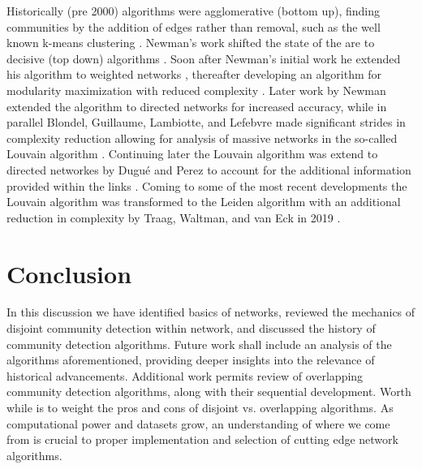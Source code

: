 \documentclass[a4paper, 12pt, twocolumn]{article}
\begin{document}
Historically (pre 2000) algorithms were agglomerative (bottom up), finding communities by the addition of edges rather than removal, such as the well known k-means clustering \cite{least_squares_PCM, some_methods}.
Newman's work shifted the state of the are to decisive (top down) algorithms \cite{com_struct_in_soc_and_bio}.
Soon after Newman's initial work he extended his algorithm to weighted networks \cite{analysis_of_wnets}, thereafter developing an algorithm for modularity maximization with reduced complexity \cite{finding_comm_struct}.
Later work by Newman extended the algorithm to directed networks \cite{com_struct_indir} for increased accuracy, while in parallel Blondel, Guillaume, Lambiotte, and Lefebvre made significant strides in complexity reduction allowing for analysis of massive networks in the so-called Louvain algorithm \cite{louvain}.
Continuing later the Louvain algorithm was extend to directed networkes by Dugu{\'e} and Perez to account for the additional information provided within the links \cite{directed_louvain}.
Coming to some of the most recent developments the Louvain algorithm was transformed to the Leiden algorithm with an additional reduction in complexity by Traag, Waltman, and van Eck in 2019 \cite{louvain_2_leiden}.


\section{Conclusion}

In this discussion we have identified basics of networks, reviewed the mechanics of disjoint community detection within network, and discussed the history of community detection algorithms.
Future work shall include an analysis of the algorithms aforementioned, providing deeper insights into the relevance of historical advancements.
Additional work permits review of overlapping community detection algorithms, along with their sequential development.
Worth while is to weight the pros and cons of disjoint vs. overlapping algorithms.
As computational power and datasets grow, an understanding of where we come from is crucial to proper implementation and selection of cutting edge network algorithms.

{}


\end{document}
